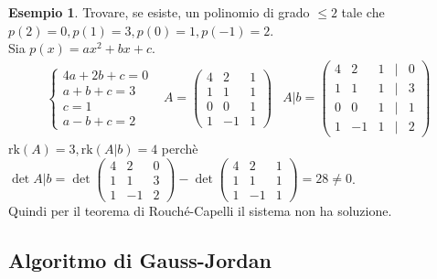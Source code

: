 \documentclass[a4paper]{article}
\theoremstyle{definition}
\newtheorem*{es}{Esempio}
\begin{document}
	\begin{es}
		Trovare, se esiste, un polinomio di grado $\le 2$ tale che $p(2) = 0, p(1) = 3, p(0) = 1, p(-1) = 2$. \\
		Sia $p(x) = ax^2 + bx + c$.
		\begin{align*}
			\begin{cases}
				4a + 2b + c = 0 \\
				a + b + c = 3 \\
				c = 1 \\
				a - b + c = 2
			\end{cases} & A = \begin{pmatrix}
				4 & 2 & 1 \\
				1 & 1 & 1 \\
				0 & 0 & 1 \\
				1 & -1 & 1
			\end{pmatrix} &
			A|b = \begin{pmatrix}
				4 & 2 & 1 & \mid & 0 \\
				1 & 1 & 1 & \mid & 3 \\
				0 & 0 & 1 & \mid & 1 \\
				1 & -1 & 1 & \mid & 2
			\end{pmatrix}
		\end{align*}
		$\text{rk}(A) = 3, \text{rk}(A|b) = 4$ perchè $\det A|b = \det \begin{pmatrix}
			4 & 2 & 0 \\
			1 & 1 & 3 \\
			1 & -1 & 2
		\end{pmatrix} - \det \begin{pmatrix}
			4 & 2 & 1 \\
			1 & 1 & 1 \\
			1 & -1 & 1
		\end{pmatrix} = 28 \ne 0$. \\
		Quindi per il teorema di Rouché-Capelli il sistema non ha soluzione.
	\end{es}

	\subsection{Algoritmo di Gauss-Jordan}
\end{document}
